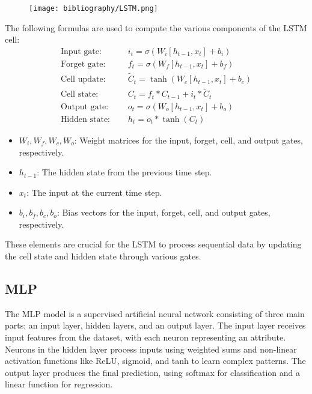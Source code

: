 \documentclass{ieeeojies}
\begin{document}
\begin{figure}[H]
    \centering
    \begin{minipage}{0.45\textwidth}
    \centering
    \texttt{[image: bibliography/LSTM.png]}    
    \label{fig:1}
    \end{minipage}
\end{figure}
The following formulas are used to compute the various components of the LSTM cell: \cite{b13}
\begin{align*}
\text{Input gate: } & \quad i_t = \sigma(W_i [h_{t-1}, x_t] + b_i) \\
\text{Forget gate: } & \quad f_t = \sigma(W_f [h_{t-1}, x_t] + b_f) \\
\text{Cell update: } & \quad \tilde{C}_t = \tanh(W_c [h_{t-1}, x_t] + b_c) \\
\text{Cell state: } & \quad C_t = f_t * C_{t-1} + i_t * \tilde{C}_t \\
\text{Output gate: } & \quad o_t = \sigma(W_o [h_{t-1}, x_t] + b_o) \\
\text{Hidden state: } & \quad h_t = o_t * \tanh(C_t)
\end{align*}

\begin{itemize}
    \item $W_i, W_f, W_c, W_o$: Weight matrices for the input, forget, cell, and output gates, respectively.
    \item $h_{t-1}$: The hidden state from the previous time step.
    \item $x_t$: The input at the current time step.
    \item $b_i, b_f, b_c, b_o$: Bias vectors for the input, forget, cell, and output gates, respectively.
\end{itemize}

These elements are crucial for the LSTM to process sequential data by updating the cell state and hidden state through various gates.

\subsection{MLP} 
The MLP model is a supervised artificial neural network consisting of three main parts: an input layer, hidden layers, and an output layer. The input layer receives input features from the dataset, with each neuron representing an attribute. Neurons in the hidden layer process inputs using weighted sums and non-linear activation functions like ReLU, sigmoid, and tanh to learn complex patterns. The output layer produces the final prediction, using softmax for classification and a linear function for regression. \cite{b14}
\end{document}
